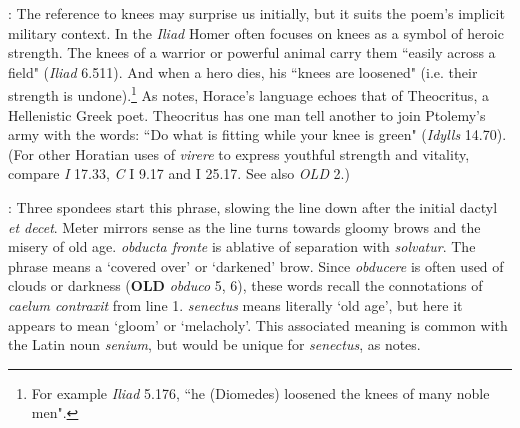
: The reference to knees may surprise us initially, but it suits the poem's implicit military context.  In the \textit{Iliad} Homer often focuses on knees as a symbol of heroic strength.  The knees of a warrior or powerful animal carry them ``easily across a field" (\textit{Iliad} 6.511).  And when a hero dies, his ``knees are loosened" (i.e. their strength is undone).\footnote{For example \textit{Iliad} 5.176, ``he (Diomedes) loosened the knees of many noble men".}  As \citet[216--217]{mankin1995} notes, Horace's language echoes that of Theocritus, a Hellenistic Greek poet. Theocritus has one man tell another to join Ptolemy's army with the words: ``Do what is fitting while your knee is green" (\textit{Idylls} 14.70).  (For other Horatian uses of \textit{virere} to express youthful strength and vitality, compare \textit{I} 17.33, \textit{C} I 9.17 and I 25.17. See also \textit{OLD} 2.)


: Three spondees start this phrase, slowing the line down after the initial dactyl \textit{et decet}.  Meter mirrors sense as the line turns towards gloomy brows and the misery of old age.  \textit{obducta fronte} is ablative of separation with \textit{solvatur}.  The phrase means a `covered over' or `darkened' brow.  Since \textit{obducere} is often used of clouds or darkness (\textbf{OLD} \textit{obduco} 5, 6), these words recall the connotations of \textit{caelum contraxit} from line 1.  \textit{senectus} means literally `old age', but here it appears to mean `gloom' or `melacholy'.  This associated meaning is common with the Latin noun \textit{senium}, but would be unique for \textit{senectus}, as \citet[217]{mankin1995} notes.


